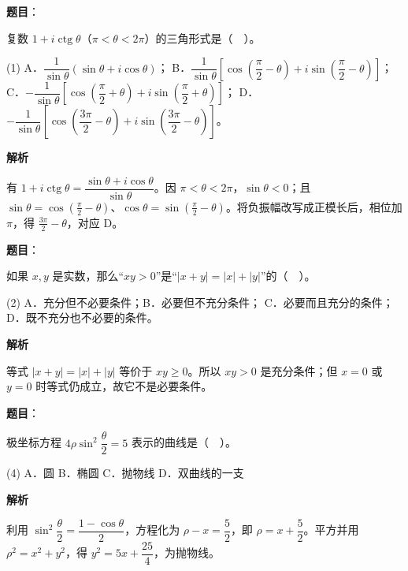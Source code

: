 \begin{answer}

\textbf{题目}：

复数 $1+i\operatorname{ctg}\theta$（$\pi<\theta<2\pi$）的三角形式是（　）。

\begin{gkopts}(1)
\task A．$\dfrac1{\sin\theta}(\sin\theta+i\cos\theta)$；
\task B．$\dfrac1{\sin\theta}\left[\cos\left(\dfrac\pi2-\theta\right)+i\sin\left(\dfrac\pi2-\theta\right)\right]$；
\task C．$-\dfrac1{\sin\theta}\left[\cos\left(\dfrac\pi2+\theta\right)+i\sin\left(\dfrac\pi2+\theta\right)\right]$；
\task D．$-\dfrac1{\sin\theta}\left[\cos\left(\dfrac{3\pi}2-\theta\right)+i\sin\left(\dfrac{3\pi}2-\theta\right)\right]$。
\end{gkopts}

\textbf{解析}

有 $1+i\operatorname{ctg}\theta=\dfrac{\sin\theta+i\cos\theta}{\sin\theta}$。因 $\pi<\theta<2\pi$，$\sin\theta<0$；且 $\sin\theta=\cos(\frac\pi2-\theta)$、$\cos\theta=\sin(\frac\pi2-\theta)$。将负振幅改写成正模长后，相位加 $\pi$，得 $\frac{3\pi}2-\theta$，对应 D。


\end{answer}
\begin{answer}

\textbf{题目}：

如果 $x,y$ 是实数，那么“$xy>0$”是“$|x+y|=|x|+|y|$”的（　）。

\begin{gkopts}(2)
\task A．充分但不必要条件；B．必要但不充分条件；
\task C．必要而且充分的条件；D．既不充分也不必要的条件。
\end{gkopts}

\textbf{解析}

等式 $|x+y|=|x|+|y|$ 等价于 $xy\ge0$。所以 $xy>0$ 是充分条件；但 $x=0$ 或 $y=0$ 时等式仍成立，故它不是必要条件。


\end{answer}
\begin{answer}

\textbf{题目}：

极坐标方程 $4\rho\sin^2\dfrac\theta2=5$ 表示的曲线是（　）。

\begin{gkopts}(4)
\task A．圆
\task B．椭圆
\task C．抛物线
\task D．双曲线的一支
\end{gkopts}

\textbf{解析}

利用 $\sin^2\dfrac\theta2=\dfrac{1-\cos\theta}{2}$，方程化为 $\rho-x=\dfrac52$，即 $\rho=x+\dfrac52$。平方并用 $\rho^2=x^2+y^2$，得 $y^2=5x+\dfrac{25}{4}$，为抛物线。


\end{answer}
